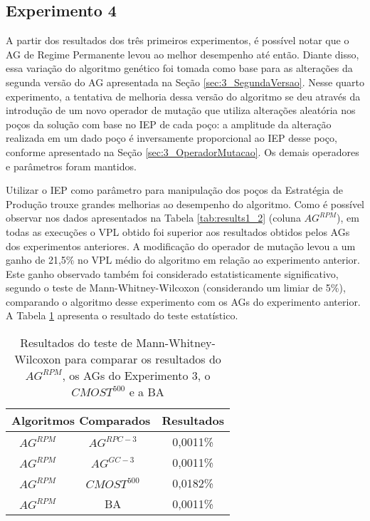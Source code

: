 \subsection{Experimento 4}
\label{ch:5_Experimento4}
A partir dos resultados dos três primeiros experimentos, é possível notar que o AG de Regime Permanente levou ao melhor desempenho até então. Diante disso, essa variação do algoritmo genético foi tomada como base para as alterações da segunda versão do AG apresentada na Seção \ref{sec:3_SegundaVersao}.  Nesse quarto experimento, a tentativa de melhoria dessa versão do algoritmo se deu através da introdução de um novo operador de mutação que utiliza alterações aleatória nos poços da solução com base no IEP de cada poço: a amplitude da alteração realizada em um dado poço é inversamente proporcional ao IEP desse poço, conforme apresentado na Seção \ref{sec:3_OperadorMutacao}. Os demais operadores e parâmetros foram mantidos.

Utilizar o IEP como parâmetro para manipulação dos poços da Estratégia de Produção trouxe grandes melhorias ao desempenho do algoritmo. Como é possível observar nos dados apresentados na Tabela \ref{tab:results1_2} (coluna $AG^{RPM}$), em todas as execuções o VPL obtido foi superior aos resultados obtidos pelos AGs dos experimentos anteriores. A modificação do operador de mutação levou a um ganho de 21,5\% no VPL médio do algoritmo em relação ao experimento anterior. Este ganho observado também foi considerado estatisticamente significativo, segundo o teste de Mann-Whitney-Wilcoxon (considerando um limiar de 5\%), comparando o algoritmo desse experimento com os AGs do experimento anterior. A Tabela \ref{tab:mw4_1} apresenta o resultado do teste estatístico.

\begin{table}[H]
\centering
\caption{Resultados do teste de Mann-Whitney-Wilcoxon para comparar os resultados do $AG^{RPM}$, os AGs do Experimento 3, o $CMOST^{500}$ e a BA}
\label{tab:mw4_1}
\begin{tabular}{|c|c|c|}
\hline
\multicolumn{2}{|c|}{Algoritmos Comparados} & Resultados \\ \hline
$AG^{RPM}$ & $AG^{RPC-3}$ & 0,0011\% \\ \hline
$AG^{RPM}$ & $AG^{GC-3}$ & 0,0011\% \\ \hline
$AG^{RPM}$ & $CMOST^{500}$ & 0,0182\% \\ \hline
$AG^{RPM}$ & BA & 0,0011\% \\ \hline


\end{tabular}
\end{table}

